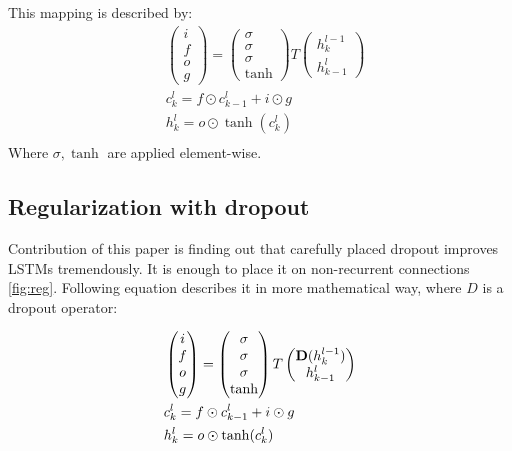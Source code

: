 \documentclass{article}
\begin{document}
This mapping is described by:
\begin{align*}
&\begin{pmatrix}i\\f\\o\\g\end{pmatrix} =
  \begin{pmatrix}\sigma\\\sigma\\\sigma\\\tanh\end{pmatrix}
  T\begin{pmatrix}h^{l - 1}_k\\h^l_{k-1}\end{pmatrix}\\
&c^l_k = f \odot c^l_{k-1} + i \odot g\\
&h^l_k = o \odot \tanh(c^l_k)\\
\end{align*}
Where $\sigma, \tanh$ are applied element-wise.



\subsection{Regularization with dropout} 
\label{sec:reg}


Contribution of this paper is finding out that
carefully placed dropout improves LSTMs tremendously. 
It is enough to place it on non-recurrent connections \ref{fig:reg}.
Following equation describes it in more mathematical way, 
where $D$ is a dropout operator:

\begin{align*}
&\begin{pmatrix}i\\f\\o\\g\end{pmatrix} =
  \begin{pmatrix}\sigma\\\sigma\\\sigma\\\tanh\end{pmatrix}
  T\begin{pmatrix}{\bf D}(h^{l - 1}_k)\\h^l_{k-1}\end{pmatrix}\\
&c^l_k = f \odot c^l_{k-1} + i \odot g\\
&h^l_k = o \odot \tanh(c^l_k)\\
\end{align*}
\end{document}
